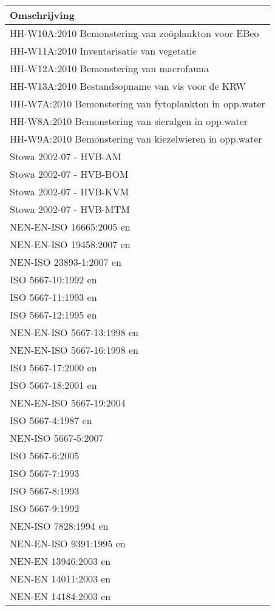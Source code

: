 \documentclass[
]{book}
\begin{document}
\begin{tabular}[t]{l}
\hline
Omschrijving\\
\hline
HH-W10A:2010 Bemonstering van zoöplankton voor EBeo\\
\hline
HH-W11A:2010 Inventarisatie van vegetatie\\
\hline
HH-W12A:2010 Bemonstering van macrofauna\\
\hline
HH-W13A:2010 Bestandsopname van vis voor de KRW\\
\hline
HH-W7A:2010 Bemonstering van fytoplankton in opp.water\\
\hline
HH-W8A:2010 Bemonstering van sieralgen in opp.water\\
\hline
HH-W9A:2010 Bemonstering van kiezelwieren in opp.water\\
\hline
Stowa 2002-07 - HVB-AM\\
\hline
Stowa 2002-07 - HVB-BOM\\
\hline
Stowa 2002-07 - HVB-KVM\\
\hline
Stowa 2002-07 - HVB-MTM\\
\hline
NEN-EN-ISO 16665:2005 en\\
\hline
NEN-EN-ISO 19458:2007 en\\
\hline
NEN-ISO 23893-1:2007 en\\
\hline
ISO 5667-10:1992 en\\
\hline
ISO 5667-11:1993 en\\
\hline
ISO 5667-12:1995 en\\
\hline
NEN-EN-ISO 5667-13:1998 en\\
\hline
NEN-EN-ISO 5667-16:1998 en\\
\hline
ISO 5667-17:2000 en\\
\hline
ISO 5667-18:2001 en\\
\hline
NEN-EN-ISO 5667-19:2004\\
\hline
ISO 5667-4:1987 en\\
\hline
NEN-ISO 5667-5:2007\\
\hline
ISO 5667-6:2005\\
\hline
ISO 5667-7:1993\\
\hline
ISO 5667-8:1993\\
\hline
ISO 5667-9:1992\\
\hline
NEN-ISO 7828:1994 en\\
\hline
NEN-EN-ISO 9391:1995 en\\
\hline
NEN-EN 13946:2003 en\\
\hline
NEN-EN 14011:2003 en\\
\hline
NEN-EN 14184:2003 en\\

\end{tabular}
\end{document}
